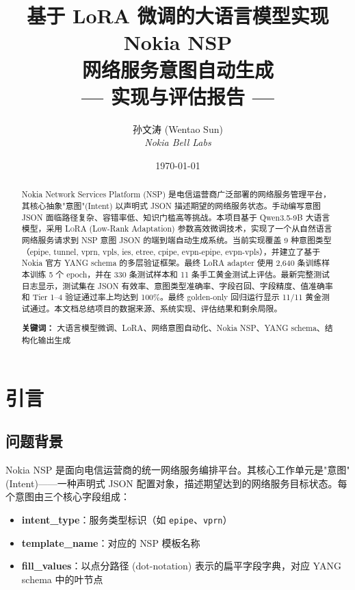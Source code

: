 \documentclass[12pt, a4paper]{article}
\title{%
  \vspace{-1cm}
  {\LARGE\bfseries 基于 LoRA 微调的大语言模型实现 Nokia NSP\\[4pt]
  网络服务意图自动生成}\\[12pt]
  {\large --- 实现与评估报告 ---}
}
\author{%
  孙文涛 (Wentao Sun) \\[3pt]
  {\small\textit{Nokia Bell Labs}}
}
\date{\today}
\newcommand{\intenttype}[1]{\texttt{#1}}
\newcommand{\yang}{\textsc{YANG}}
\newcommand{\nsp}{\textsc{NSP}}
\newcommand{\lora}{\textsc{LoRA}}
\begin{document}
\maketitle
\thispagestyle{empty}

\begin{abstract}
\noindent
Nokia Network Services Platform (\nsp{}) 是电信运营商广泛部署的网络服务管理平台，其核心抽象"意图"(Intent) 以声明式 JSON 描述期望的网络服务状态。手动编写意图 JSON 面临路径复杂、容错率低、知识门槛高等挑战。本项目基于 Qwen3.5-9B 大语言模型，采用 \lora{} (Low-Rank Adaptation) 参数高效微调技术，实现了一个从自然语言网络服务请求到 \nsp{} 意图 JSON 的端到端自动生成系统。当前实现覆盖 9 种意图类型（epipe, tunnel, vprn, vpls, ies, etree, cpipe, evpn-epipe, evpn-vpls），并建立了基于 Nokia 官方 \yang{} schema 的多层验证框架。最终 LoRA adapter 使用 2,640 条训练样本训练 5 个 epoch，并在 330 条测试样本和 11 条手工黄金测试上评估。最新完整测试日志显示，测试集在 JSON 有效率、意图类型准确率、字段召回、字段精度、值准确率和 Tier 1--4 验证通过率上均达到 100\%。最终 golden-only 回归运行显示 11/11 黄金测试通过。本文档总结项目的数据来源、系统实现、评估结果和剩余局限。

\vspace{6pt}
\noindent\textbf{关键词：} 大语言模型微调、LoRA、网络意图自动化、Nokia NSP、YANG schema、结构化输出生成
\end{abstract}

\newpage
\tableofcontents
\newpage

\section{引言}

\subsection{问题背景}

Nokia \nsp{} 是面向电信运营商的统一网络服务编排平台。其核心工作单元是"意图" (Intent)——一种声明式 JSON 配置对象，描述期望达到的网络服务目标状态。每个意图由三个核心字段组成：

\begin{itemize}
  \item \textbf{intent\_type}：服务类型标识（如 \intenttype{epipe}、\intenttype{vprn}）
  \item \textbf{template\_name}：对应的 \nsp{} 模板名称
  \item \textbf{fill\_values}：以点分路径 (dot-notation) 表示的扁平字段字典，对应 \yang{} schema 中的叶节点
\end{itemize}
\end{document}

